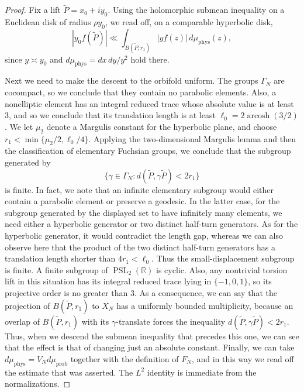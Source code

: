 \documentclass[11pt,reqno]{amsart}
\theoremstyle{definition}
\newcommand{\R}{\mathbb R}
\begin{document}
\begin{proof}
Fix a lift $\widetilde P=x_0+iy_0$.  Using the holomorphic submean inequality on a Euclidean disk of radius $\rho y_0$,
we read off, on a comparable hyperbolic disk, \[ |y_0f(\widetilde P)|\ll
\int_{B(\widetilde P,r_1)}|yf(z)|\,d\mu_{\mathrm{phys}}(z), \] since
$y\asymp y_0$ and $d\mu_{\mathrm{phys}}=dx\,dy/y^2$ hold there.

Next we need to make the descent to the orbifold uniform. The groups $\Gamma_N$ are cocompact, so we conclude that they contain no
parabolic elements. Also, a nonelliptic element has an integral reduced trace whose absolute
value is at least $3$, and so we conclude that its translation length is at
least $\ell_0=2\operatorname{arcosh}(3/2)$. We let $\mu_2$ denote a Margulis constant for the hyperbolic plane, and
choose $r_1<\min\{\mu_2/2,\ell_0/4\}$. Applying the two-dimensional Margulis lemma \cite{Ratcliffe} and then the
classification of elementary Fuchsian groups, we conclude that the subgroup
generated by \[ \{\gamma\in\Gamma_N: d(\widetilde P,\gamma\widetilde P)<2r_1\}
\] is finite. In fact, we note that an infinite elementary subgroup would either contain a
parabolic element or preserve a geodesic. In the latter case, for the subgroup generated by the displayed set to have
infinitely many elements, we need either a hyperbolic generator or two
distinct half-turn generators. As for the hyperbolic generator, it would contradict the
length gap, whereas we can also observe here that the product of the two
distinct half-turn generators has a translation length shorter than
$4r_1<\ell_0$. 
Thus the small-displacement subgroup is finite. A finite subgroup of
$\operatorname{PSL}_2(\R)$ is cyclic. Also, any nontrivial torsion lift in this situation has its
integral reduced trace lying in $\{-1,0,1\}$, so its projective order is no greater than $3$. As a consequence, we can say that the projection of $B(\widetilde P,r_1)$ to
$X_N$ has a uniformly bounded multiplicity, because an overlap of $B(\widetilde P,r_1)$ with its $\gamma$-translate forces
the inequality $d(\widetilde P,\gamma\widetilde P)<2r_1$.
Thus, when we descend the submean inequality that precedes this one, we can
see that the effect is that of changing just an absolute constant. Finally, we can take $d\mu_{\mathrm{phys}}=V_Nd\mu_{\mathrm{prob}}$ together
with the definition of $F_N$, and in this way we read off the
estimate that was asserted. The $L^2$ identity is immediate from the
normalizations.
\end{proof}
\end{document}
